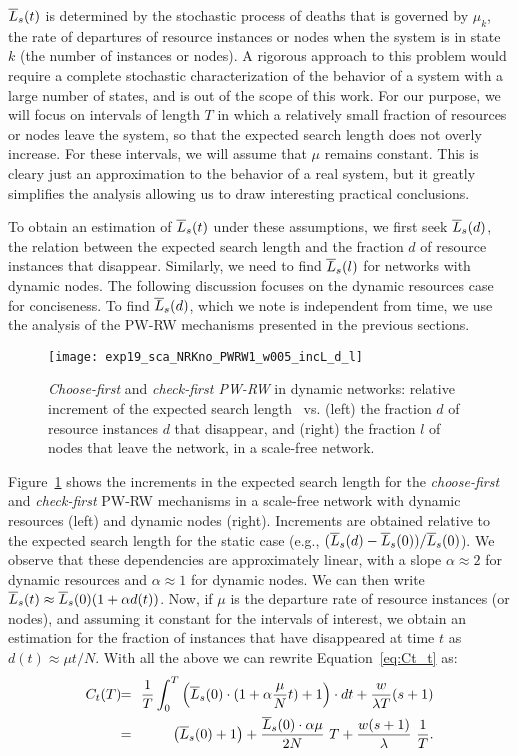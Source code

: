 \documentclass[]{elsarticle}
\newcommand{\s}		{\ensuremath{s}}		\newcommand{\sopt}	{\ensuremath{s_{opt}}}		\newcommand{\p}		{\ensuremath{p}}		\newcommand{\W}		{\ensuremath{W}}		\newcommand{\w}		{\ensuremath{w}}		\newcommand{\lsave}	{\ensuremath{\overline{l}_s}}	\newcommand{\lave}	{\ensuremath{\overline{l}}}	\newcommand{\lopt}	{\ensuremath{\overline{l}_{opt}}}
\begin{document}
$\overline{L}_s(t)$ is determined by the stochastic process of deaths that is governed by $\mu_k$, the rate of departures of resource instances or nodes when the system is in state $k$ (the number of instances or nodes). A rigorous approach to this problem would require a complete stochastic characterization of the behavior of a system with a large number of states, and is out of the scope of this work. For our purpose, we will focus on intervals of length $T$ in which a relatively small fraction of resources or nodes leave the system, so that the expected search length does not overly increase. For these intervals, we will assume that $\mu$ remains constant. This is cleary just an approximation to the behavior of a real system, but it greatly simplifies the analysis allowing us to draw interesting practical conclusions.

To obtain an estimation of $\overline{L}_s(t)$ under these assumptions, we first seek $\overline{L}_s(d)$, the relation between the expected search length and the fraction $d$ of resource instances that disappear. Similarly, we need to find $\overline{L}_s(l)$ for networks with dynamic nodes. The following discussion focuses on the dynamic resources case for conciseness. To find $\overline{L}_s(d)$, which we note is independent from time, we use the analysis of the PW-RW mechanisms presented in the previous sections.

\begin{figure}
 \centering
 \texttt{[image: exp19\_sca\_NRKno\_PWRW1\_w005\_incL\_d\_l]}
 \caption{\emph{Choose-first} and \emph{check-first PW-RW} in dynamic networks: relative increment of the expected search length \Lsexp\ vs. (left) the fraction $d$ of resource instances $d$ that disappear, and (right) the fraction $l$ of nodes that leave the network, in a scale-free network.}
 \label{fig:sca_incL_d_l}
\end{figure}

Figure~\ref{fig:sca_incL_d_l} shows the increments in the expected search length for the \emph{choose-first} and \emph{check-first} PW-RW mechanisms in a scale-free network with dynamic resources (left) and dynamic nodes (right). Increments are obtained relative to the expected search length for the static case (e.g., $(\overline{L}_s(d)-\overline{L}_s(0))/\overline{L}_s(0)$). We observe that these dependencies are approximately linear, with a slope $\alpha \approx 2$ for dynamic resources and $\alpha \approx 1$ for dynamic nodes. We can then write $\overline{L}_s(t) \approx \overline{L}_s(0) (1+\alpha d(t))$. Now, if $\mu$ is the departure rate of resource instances (or nodes), and assuming it constant for the intervals of interest, we obtain an estimation for the fraction of instances that have disappeared at time $t$ as $d(t)\approx \mu t/N$. With all the above we can rewrite Equation~\ref{eq:Ct_t} as:
\begin{eqnarray}
 C_t(T) \!\! & = \!\! & \frac{1}{T}\int_0^T\left(\Lsexp(0)\cdot(1+\alpha \frac{\mu}{N}t)+1\right) \cdot dt + \frac{w}{\lambda T}(\s+1) \nonumber \\
        \!\! & = \!\! & \left(\Lsexp(0) + 1\right) + \frac{\Lsexp(0)\cdot\alpha\mu}{2N}\ T + \frac{w(s+1)}{\lambda}\ \frac{1}{T}.
 \label{eq:Ct_t2}
\end{eqnarray}
\end{document}
